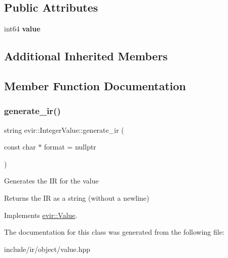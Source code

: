 \subsection*{Public Attributes}
\begin{DoxyCompactItemize}
\item 
\mbox{\label{classevir_1_1IntegerValue_aa93d03b5f0b6a7de8267d18de1b1774b}} 
int64 {\bfseries value}
\end{DoxyCompactItemize}
\subsection*{Additional Inherited Members}


\subsection{Member Function Documentation}
\mbox{\label{classevir_1_1IntegerValue_a586411c365b2afc18fbd5960dd053d94}} 
\subsubsection{\texorpdfstring{generate\+\_\+ir()}{generate\_ir()}}
{\footnotesize\ttfamily string evir\+::\+Integer\+Value\+::generate\+\_\+ir (\begin{DoxyParamCaption}\item[{const char $\ast$}]{format = {\ttfamily nullptr} }\end{DoxyParamCaption})\hspace{0.3cm}{\ttfamily [virtual]}}

Generates the IR for the value \begin{DoxyReturn}{Returns}
the IR as a string (without a newline) 
\end{DoxyReturn}


Implements \hyperlink{classevir_1_1Value_a3e7e5bc634fd5bba528324076fe2a763}{evir\+::\+Value}.



The documentation for this class was generated from the following file\+:\begin{DoxyCompactItemize}
\item 
include/ir/object/value.\+hpp\end{DoxyCompactItemize}
